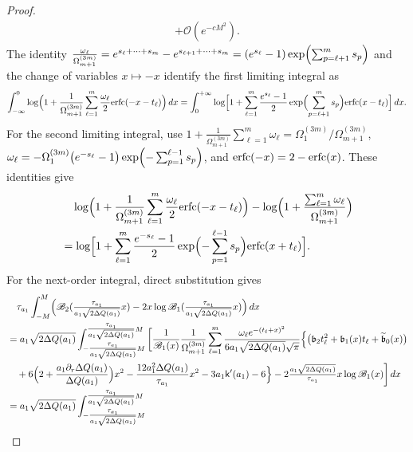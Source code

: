 \documentclass[a4paper]{article}
\newcommand{\erfc}{{\rm erfc}}
\numberwithin{equation}{section}
\begin{document}
\begin{proof}
\begin{align*}
+\mathcal{O}(e^{-cM^2}).
\end{align*}
The identity $\frac{\omega_{\ell}}{\Omega_{m+1}^{(3m)}}
=
e^{s_{\ell}+\cdots +s_{m}}-e^{s_{\ell+1}+\cdots +s_{m}}
=
(e^{s_{\ell}}-1)\exp\Bigl( 
\sum_{p=\ell+1}^{m}s_{p}
\Bigr)$ and the change of variables $x\mapsto-x$ identify the first limiting
integral as
\[
\int_{-\infty}^{0}
\log\Bigl( 
1+\frac{1}{\Omega_{m+1}^{(3m)}}\sum_{\ell=1}^{m}\frac{\omega_{\ell}}{2}
\erfc(-x-t_{\ell})
\Bigr)\,dx
=
\int_0^{+\infty}
\log\Bigl[
1+\sum_{\ell=1}^{m}\frac{e^{s_{\ell}}-1}{2}
\exp\Bigl( 
\sum_{p=\ell+1}^{m}s_{p}
\Bigr)
\erfc(x-t_{\ell})
\Bigr]\,dx. 
\]
For the second limiting integral, use
$1+\frac{1}{\Omega_{m+1}^{(3m)}}\sum_{\ell=1}^{m}\omega_{\ell}
=\Omega_{1}^{(3m)}/\Omega_{m+1}^{(3m)}$,
$\omega_{\ell}=-\Omega_1^{(3m)}\bigl( 
e^{-s_{\ell}}-1
\bigr)
\exp\Bigl( 
-\sum_{p=1}^{\ell-1}s_{p}
\Bigr)$, and $\erfc(-x)=2-\erfc(x)$.  These identities give
\begin{align*}
&\quad \log\Bigl( 
1+\frac{1}{\Omega_{m+1}^{(3m)}}\sum_{\ell=1}^{m}\frac{\omega_{\ell}}{2}
\erfc(-x-t_{\ell})
\Bigr)
-
\log\Bigl(1+\frac{\sum_{\ell=1}^{m}\omega_{\ell}}{\Omega_{m+1}^{(3m)}}\Bigr)
\\
&=
\log\Bigl[ 
1+\sum_{\ell=1}^{m}\frac{e^{-s_{\ell}}-1}{2}
\exp\Bigl( 
-\sum_{p=1}^{\ell-1}s_{p}
\Bigr)
\erfc(x+t_{\ell})
\Bigr]. 
\end{align*} 
For the next-order integral, direct substitution gives
\begin{align*}
&\quad\tau_{a_1}
\int_{-M}^{M}
\Bigl( 
\mathscr{B}_{2}(\tfrac{\tau_{a_1}}{a_1\sqrt{2\Delta Q(a_1)}}x)
-2x\log \mathscr{B}_{1}(\tfrac{\tau_{a_1}}{a_1\sqrt{2\Delta Q(a_1)}}x)
\Bigr)\,dx
\\
&=
a_1\sqrt{2\Delta Q(a_1)}
\int_{-\tfrac{\tau_{a_1}}{a_1\sqrt{2\Delta Q(a_1)}}M}^{\tfrac{\tau_{a_1}}{a_1\sqrt{2\Delta Q(a_1)}}M}
\bigg[
\frac{1}{\mathscr{B}_1(x)}
\frac{1}{\Omega_{m+1}^{(3m)}}
\sum_{\ell=1}^{m}
\frac{\omega_{\ell}e^{-(t_{\ell}+x)^2}}{6a_1\sqrt{2\Delta Q(a_1)}\sqrt{\pi}}
\Bigl\{
\bigl( 
\mathfrak{b}_2t_{\ell}^2+\mathfrak{b}_1(x)t_{\ell}+\widetilde{\mathfrak{b}}_0(x)
\bigr)
\\
&\quad
+6\Bigl(
2+\frac{a_1\partial_r\Delta Q(a_1)}{\Delta Q(a_1)}
\Bigr)x^2
-\frac{12a_1^2\Delta Q(a_1)}{\tau_{a_1}}x^2
-3a_1\mathsf{k}'(a_1)-6
\Bigr\}
-2\tfrac{a_1\sqrt{2\Delta Q(a_1)}}{\tau_{a_1}}x\log \mathscr{B}_{1}(x)
\bigg]
\,dx
\\
&=
a_1\sqrt{2\Delta Q(a_1)}
\int_{-\tfrac{\tau_{a_1}}{a_1\sqrt{2\Delta Q(a_1)}}M}^{\tfrac{\tau_{a_1}}{a_1\sqrt{2\Delta Q(a_1)}}M}
\\

\end{align*}
\end{proof}
\end{document}
